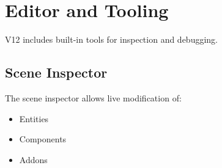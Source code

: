\section{Editor and Tooling}

V12 includes built-in tools for inspection and debugging.

\subsection{Scene Inspector}
The scene inspector allows live modification of:
\begin{itemize}
	\item Entities
	\item Components
	\item Addons
\end{itemize}

